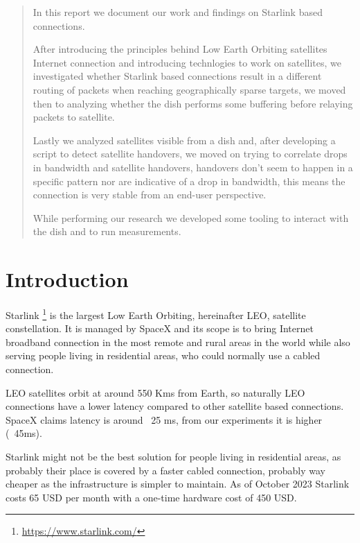 \documentclass[IN,11pt,twoside,openright,bachelor,english]{tumthesis}
\author{Roberto Castellotti}
\date{September 15, 2016}
\begin{document}
\maketitle
\cleardoublepage

\begin{abstract} 
In this report we document our work and findings on Starlink based connections. 

After introducing the principles behind Low Earth Orbiting satellites Internet connection and introducing technlogies to work on satellites, we investigated whether Starlink based connections result in a different routing of packets when reaching geographically sparse targets, we moved then to analyzing whether the dish performs some buffering before relaying packets to satellite.

Lastly we analyzed satellites visible from a dish and, after developing a script to detect satellite handovers, we moved on trying to correlate drops in bandwidth and satellite handovers, handovers don't seem to happen in a specific pattern nor are indicative of a drop in bandwidth, this means the connection is very stable from an end-user perspective.

While performing our research we developed some tooling to interact with the dish and to run measurements.
\end{abstract}

\tableofcontents
\listoffigures
\listoftables
\startcontent

\chapter{Introduction}

Starlink \footnote{\url{https://www.starlink.com/}} is the largest Low Earth Orbiting, hereinafter LEO, satellite constellation. It is managed by SpaceX and its scope is to bring Internet broadband connection in the most remote and rural areas in the world while also serving people living in residential areas, who could normally use a cabled connection.

LEO satellites orbit at around 550 Kms from Earth, so naturally LEO connections have a lower latency compared to other satellite based connections. SpaceX claims latency is around ~25 ms, from our experiments it is higher (~45ms). 

Starlink might not be the best solution for people living in residential areas, as probably their place is covered by a faster cabled connection, probably way cheaper as the infrastructure is simpler to maintain. As of October 2023 Starlink costs 65 USD per month with a one-time hardware cost of 450 USD. 
\end{document}

